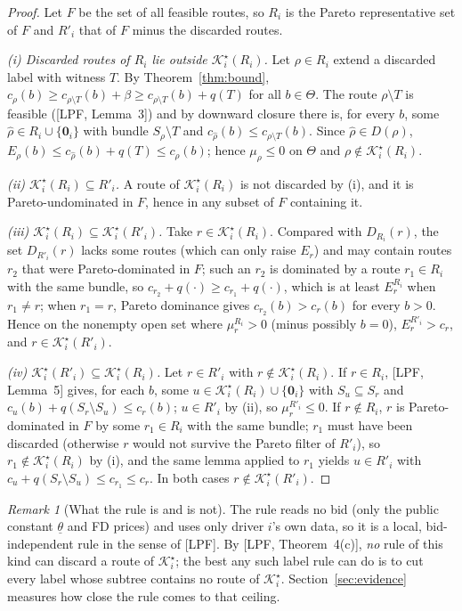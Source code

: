 \documentclass[11pt]{article}
\theoremstyle{definition}
\theoremstyle{remark}
\newtheorem{remark}[theorem]{Remark}
\newcommand{\Ks}{\mathcal{K}^{\star}}
\newcommand{\thl}{\underline{\theta}}
\newcommand{\0}{\mathbf{0}}
\begin{document}
\begin{proof}
Let $F$ be the set of all feasible routes, so $R_i$ is the Pareto representative set of $F$
and $R'_i$ that of $F$ minus the discarded routes.

\emph{(i) Discarded routes of $R_i$ lie outside $\Ks_i(R_i)$.} Let $\rho\in R_i$ extend a discarded
label with witness $T$. By Theorem~\ref{thm:bound},
$c_\rho(b)\ge c_{\rho\setminus T}(b)+\beta\ge c_{\rho\setminus T}(b)+q(T)$ for all $b\in\Theta$.
The route $\rho\setminus T$ is feasible ([LPF, Lemma~3]) and by downward closure there is, for
every $b$, some $\hat\rho\in R_i\cup\{\0_i\}$ with bundle $S_\rho\setminus T$ and
$c_{\hat\rho}(b)\le c_{\rho\setminus T}(b)$. Since $\hat\rho\in D(\rho)$,
$E_\rho(b)\le c_{\hat\rho}(b)+q(T)\le c_\rho(b)$; hence $\mu_\rho\le0$ on $\Theta$ and
$\rho\notin\Ks_i(R_i)$.

\emph{(ii) $\Ks_i(R_i)\subseteq R'_i$.} A route of $\Ks_i(R_i)$ is not discarded by (i), and it is
Pareto-undominated in $F$, hence in any subset of $F$ containing it.

\emph{(iii) $\Ks_i(R_i)\subseteq\Ks_i(R'_i)$.} Take $r\in\Ks_i(R_i)$. Compared with $D_{R_i}(r)$, the
set $D_{R'_i}(r)$ lacks some routes (which can only raise $E_r$) and may contain routes $r_2$
that were Pareto-dominated in $F$; such an $r_2$ is dominated by a route $r_1\in R_i$ with the same
bundle, so $c_{r_2}+q(\cdot)\ge c_{r_1}+q(\cdot)$, which is at least $E^{R_i}_r$ when $r_1\ne r$; when $r_1=r$,
Pareto dominance gives $c_{r_2}(b)>c_r(b)$ for every $b>0$. Hence on the nonempty open set where
$\mu^{R_i}_r>0$ (minus possibly $b=0$), $E^{R'_i}_r>c_r$, and $r\in\Ks_i(R'_i)$.

\emph{(iv) $\Ks_i(R'_i)\subseteq\Ks_i(R_i)$.} Let $r\in R'_i$ with $r\notin\Ks_i(R_i)$. If $r\in R_i$,
[LPF, Lemma~5] gives, for each $b$, some $u\in\Ks_i(R_i)\cup\{\0_i\}$ with $S_u\subseteq S_r$ and
$c_u(b)+q(S_r\setminus S_u)\le c_r(b)$; $u\in R'_i$ by (ii), so $\mu^{R'_i}_r\le 0$. If
$r\notin R_i$, $r$ is Pareto-dominated in $F$ by some $r_1\in R_i$ with the same bundle; $r_1$ must
have been discarded (otherwise $r$ would not survive the Pareto filter of $R'_i$), so
$r_1\notin\Ks_i(R_i)$ by (i), and the same lemma applied to $r_1$ yields $u\in R'_i$ with
$c_u+q(S_r\setminus S_u)\le c_{r_1}\le c_r$. In both cases $r\notin\Ks_i(R'_i)$.
\end{proof}

\begin{remark}[What the rule is and is not]
The rule reads no bid (only the public constant $\thl$ and FD prices) and uses only driver $i$'s
own data, so it is a local, bid-independent rule in the sense of [LPF]. By [LPF, Theorem~4(c)],
\emph{no} rule of this kind can discard a route of $\Ks_i$; the best any such label rule can do
is to cut every label whose subtree contains no route of $\Ks_i$. Section~\ref{sec:evidence}
measures how close the rule comes to that ceiling.
\end{remark}
\end{document}
